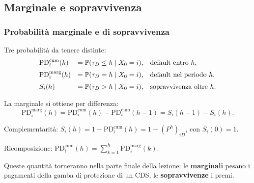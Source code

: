 \subsection{Marginale e sopravvivenza}%

\begin{frame}%
%

\frametitle{Probabilit\`{a} marginale e di sopravvivenza}%
%

%


Tre probabilit\`{a} da tenere distinte:
\[%
\begin{array}
[c]{lll}%
\mathrm{PD}_{i}^{\mathrm{cum}}(h) & = \Prob(\tau_{D}\leq h\mid X_{0}=i), &
\text{default entro }h,\\[2mm]%
\mathrm{PD}_{i}^{\mathrm{marg}}(h) & = \Prob(\tau_{D}=h\mid X_{0}=i), &
\text{default nel periodo }h,\\[2mm]%
S_{i}(h) & = \Prob(\tau_{D}>h\mid X_{0}=i), & \text{sopravvivenza oltre }h.
\end{array}
\]


\medskip

\begin{stepitemize}
\item La marginale si ottiene per differenza:
\[
\mathrm{PD}_{i}^{\mathrm{marg}}(h) = \mathrm{PD}_{i}^{\mathrm{cum}}(h) -
\mathrm{PD}_{i}^{\mathrm{cum}}(h-1) = S_{i}(h-1)-S_{i}(h).
\]


\item Complementarit\`{a}: $S_{i}(h)=1-\mathrm{PD}_{i}^{\mathrm{cum}}(h)
=1-(P^{h})_{iD}$, con $S_{i}(0)=1$.

\item Ricomposizione: $\mathrm{PD}_{i}^{\mathrm{cum}}(h) =\sum_{k=1}%
^{h}\mathrm{PD}_{i}^{\mathrm{marg}}(k)$.
\end{stepitemize}

\medskip

\begin{center}
{\small Queste quantit\`{a} torneranno nella parte finale della lezione: le
\textbf{marginali} pesano i pagamenti della gamba di protezione di un CDS, le
\textbf{sopravvivenze} i premi.}
\end{center}

%

\transboxout
\end{frame}%


